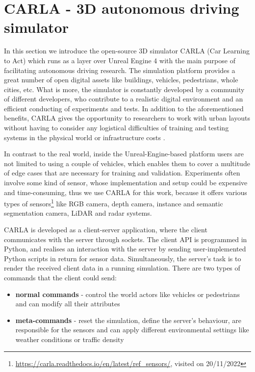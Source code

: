 \section{CARLA - 3D autonomous driving simulator}\label{carla_background}
In this section we introduce the open-source 3D simulator CARLA (Car Learning to Act) which runs as a layer over Unreal Engine 4 with the main purpose of facilitating autonomous driving research. The simulation platform provides a great number of open digital assets like buildings, vehicles, pedestrians, whole cities, etc. What is more, the simulator is constantly developed by a community of different developers, who contribute to a realistic digital environment and an efficient conducting of experiments and tests. In addition to the aforementioned benefits, CARLA gives the opportunity to researchers to work with urban layouts without having to consider any logistical difficulties of training and testing systems in the physical world or infrastructure costs \cite{carla_paper}. 

In contrast to the real world, inside the Unreal-Engine-based platform users are not limited to using a couple of vehicles, which enables them to cover a multitude of edge cases that are necessary for training and validation. Experiments often involve some kind of sensor, whose implementation and setup could be expensive and time-consuming, thus we use CARLA for this work, because it offers various types of sensors\footnote{\url{https://carla.readthedocs.io/en/latest/ref_sensors/}, visited on 20/11/2022} like RGB camera, depth camera, instance and semantic segmentation camera, LiDAR and radar systems.

CARLA is developed as a client-server application, where the client communicates with the server through sockets. The client API is programmed in Python, and realises an interaction with the server by sending user-implemented Python scripts in return for sensor data. Simultaneously, the server's task is to render the received client data in a running simulation. There are two types of commands that the client could send:
\begin{itemize}
    \item \textbf{normal commands} - control the world actors like vehicles or pedestrians and can modify all their attributes
    \item \textbf{meta-commands} - reset the simulation, define the server's behaviour, are responsible for the sensors and can apply different environmental settings like weather conditions or traffic density
\end{itemize}

